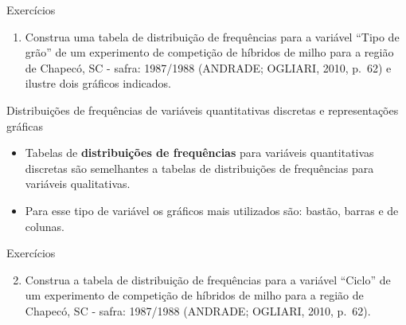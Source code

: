 \documentclass[
  ignorenonframetext,
]{beamer}
\providecommand{\tightlist}{%
  \setlength{\itemsep}{0pt}\setlength{\parskip}{0pt}}\usepackage{longtable,booktabs,array}
\begin{document}
\begin{frame}
\begin{block}{Exercícios}
\label{exercuxedcios}
\begin{enumerate}
\tightlist
\item
  Construa uma tabela de distribuição de frequências para a variável
  ``Tipo de grão'' de um experimento de competição de híbridos de milho
  para a região de Chapecó, SC - safra: 1987/1988 (ANDRADE; OGLIARI,
  2010, p.~62) e ilustre dois gráficos indicados.
\end{enumerate}
\end{block}
\end{frame}

\begin{frame}
\begin{block}{Distribuições de frequências de variáveis quantitativas
discretas e representações gráficas}
\label{distribuiuxe7uxf5es-de-frequuxeancias-de-variuxe1veis-quantitativas-discretas-e-representauxe7uxf5es-gruxe1ficas}
\begin{itemize}
\tightlist
\item
  Tabelas de \textbf{distribuições de frequências} para variáveis
  quantitativas discretas são semelhantes a tabelas de distribuições de
  frequências para variáveis qualitativas.
\end{itemize}

\begin{itemize}
\tightlist
\item
  Para esse tipo de variável os gráficos mais utilizados são: bastão,
  barras e de colunas.
\end{itemize}
\end{block}
\end{frame}

\begin{frame}
\begin{block}{Exercícios}
\label{exercuxedcios-1}
\begin{enumerate}
\setcounter{enumi}{1}
\tightlist
\item
  Construa a tabela de distribuição de frequências para a variável
  ``Ciclo'' de um experimento de competição de híbridos de milho para a
  região de Chapecó, SC - safra: 1987/1988 (ANDRADE; OGLIARI, 2010,
  p.~62).
\end{enumerate}
\end{block}
\end{frame}
\end{document}
